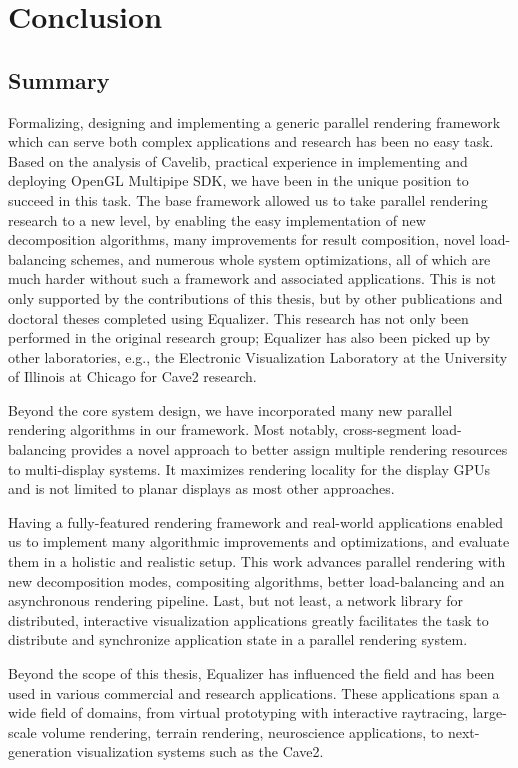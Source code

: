 \chapter{Conclusion}\label{sConclusion}

\section{Summary}

Formalizing, designing and implementing a generic parallel rendering framework
which can serve both complex applications and research has been no easy task.
Based on the analysis of Cavelib, practical experience in implementing and
deploying OpenGL Multipipe SDK, we have been in the unique position to succeed
in this task. The base framework allowed us to take parallel rendering research
to a new level, by enabling the easy implementation of new decomposition
algorithms, many improvements for result composition, novel load-balancing
schemes, and numerous whole system optimizations, all of which are much harder
without such a framework and associated applications. This is not only
supported by the contributions of this thesis, but by other publications and
doctoral theses completed using Equalizer. This research has not only been
performed in the original research group; Equalizer has also been picked up by
other laboratories, e.g., the Electronic Visualization Laboratory at the
University of Illinois at Chicago for Cave2 research.

Beyond the core system design, we have incorporated many new parallel rendering
algorithms in our framework. Most notably, cross-segment load-balancing
provides a novel approach to better assign multiple rendering resources to
multi-display systems. It maximizes rendering locality for the display GPUs and
is not limited to planar displays as most other approaches.

Having a fully-featured rendering framework and real-world applications enabled
us to implement many algorithmic improvements and optimizations, and evaluate
them in a holistic and realistic setup. This work advances parallel rendering
with new decomposition modes, compositing algorithms, better load-balancing and
an asynchronous rendering pipeline. Last, but not least, a network library for
distributed, interactive visualization applications greatly facilitates the
task to distribute and synchronize application state in a parallel rendering
system.

Beyond the scope of this thesis, Equalizer has influenced the field and has
been used in various commercial and research applications. These applications
span a wide field of domains, from virtual prototyping with interactive
raytracing, large-scale volume rendering, terrain rendering, neuroscience
applications, to next-generation visualization systems such as the Cave2.

